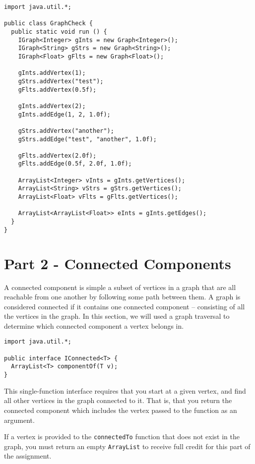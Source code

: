 \documentclass{article}
\begin{document}
\begin{verbatim}
import java.util.*;

public class GraphCheck {
  public static void run () {
    IGraph<Integer> gInts = new Graph<Integer>();
    IGraph<String> gStrs = new Graph<String>();
    IGraph<Float> gFlts = new Graph<Float>();

    gInts.addVertex(1);
    gStrs.addVertex("test");
    gFlts.addVertex(0.5f);

    gInts.addVertex(2);
    gInts.addEdge(1, 2, 1.0f);
    
    gStrs.addVertex("another");
    gStrs.addEdge("test", "another", 1.0f);

    gFlts.addVertex(2.0f);
    gFlts.addEdge(0.5f, 2.0f, 1.0f);

    ArrayList<Integer> vInts = gInts.getVertices();
    ArrayList<String> vStrs = gStrs.getVertices();
    ArrayList<Float> vFlts = gFlts.getVertices();

    ArrayList<ArrayList<Float>> eInts = gInts.getEdges();
  }
}
\end{verbatim}

\section*{Part 2 - Connected Components}

A connected component is simple a subset of vertices in a graph that are all
reachable from one another by following some path between them.  A graph is
considered connected if it contains one connected component -- consisting of
all the vertices in the graph.  In this section, we will used a graph traversal
to determine which connected component a vertex belongs in.

\begin{verbatim}
import java.util.*;

public interface IConnected<T> {
  ArrayList<T> componentOf(T v);
}
\end{verbatim}

This single-function interface requires that you start at a given vertex, and
find all other vertices in the graph connected to it.  That is, that you return
the connected component which includes the vertex passed to the function as an
argument.

If a vertex is provided to the \texttt{connectedTo} function that does not
exist in the graph, you must return an empty \texttt{ArrayList} to receive full
credit for this part of the assignment.
\end{document}
